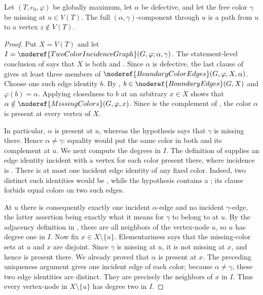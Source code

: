 \begin{lemma}
Let $(T,e_0,\varphi)$ be globally maximum, let $\alpha$ be defective, and
let the free color $\gamma$ be missing at $u\in V(T)$.  The full
$(\alpha,\gamma)$-component through $u$ is a path from $u$ to a vertex
$z\notin V(T)$.
\end{lemma}
\begin{proof}
Put $X=V(T)$ and let
$I=\noderef{TwoColorIncidenceGraph}(G,\varphi;\alpha,\gamma)$.  The
statement-level conclusion of  says
that $X$ is both  and
.  Since $\alpha$ is defective, the last
clause of  gives at least three
members of
$\noderef{BoundaryColorEdges}(G,\varphi,X,\alpha)$.  Choose one such edge
identity $b$.  By ,
$b\in\noderef{BoundaryEdges}(G,X)$ and $\varphi(b)=\alpha$.  Applying
closedness to $b$ at an arbitrary $x\in X$ shows that
$\alpha\notin\noderef{MissingColors}(G,\varphi,x)$.  Since
 is the complement of
, the color $\alpha$ is present at every vertex of
$X$.

In particular, $\alpha$ is present at $u$, whereas the hypothesis says
that $\gamma$ is missing there.  Hence $\alpha\ne\gamma$: equality would
put the same color in both  and its complement
 at $u$.  We next compute the degrees in $I$.
The definition of  supplies an edge identity
incident with a vertex for each color present there, where incidence is
.  There is at most one incident edge identity of any
fixed color.  Indeed, two distinct such identities would be
, while the 
hypothesis contains a ; its
 clause forbids equal colors on two such
edges.

At $u$ there is consequently exactly one incident $\alpha$-edge and no
incident $\gamma$-edge, the latter assertion being exactly what it means
for $\gamma$ to belong to  at $u$.  By the
adjacency definition in , these are all
neighbors of the vertex-node $u$, so $u$ has degree one in $I$.  Now fix
$x\in X\setminus\{u\}$.  Elementariness says that the missing-color sets
at $u$ and $x$ are disjoint.  Since $\gamma$ is missing at $u$, it is not
missing at $x$, and hence is present there.  We already proved that
$\alpha$ is present at $x$.  The preceding uniqueness argument gives one
incident edge of each color; because $\alpha\ne\gamma$, these two edge
identities are distinct.  They are precisely the neighbors of $x$ in
$I$.  Thus every vertex-node in $X\setminus\{u\}$ has degree two in $I$.


\end{proof}

